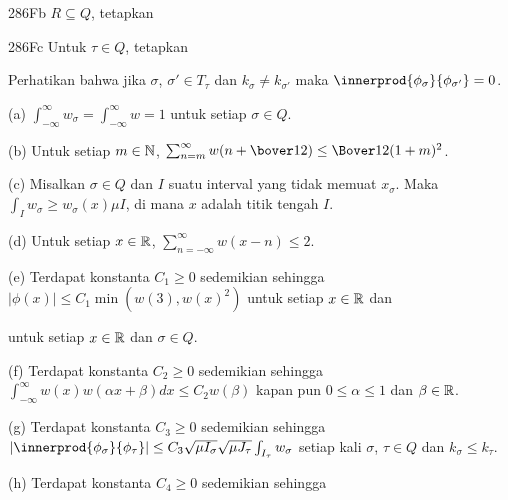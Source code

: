\spheader 286Fb $R\subseteq Q$, tetapkan


 
\spheader 286Fc Untuk $\tau\in Q$, tetapkan


\noindent Perhatikan bahwa jika $\sigma$, $\sigma'\in T_{\tau}$ dan
$k_{\sigma}\ne k_{\sigma'}$ maka
$\innerprod{\phi_{\sigma}}{\phi_{\sigma'}}=0$.

 (a)
$\int_{-\infty}^{\infty}w_{\sigma}=\int_{-\infty}^{\infty}w=1$ untuk setiap
$\sigma\in Q$.

(b) Untuk setiap $m\in\Bbb N$,
$\sum_{n=m}^{\infty}w(n+\bover12)\le\Bover1{2(1+m)^2}$.

(c) Misalkan $\sigma\in Q$ dan $I$ suatu interval yang tidak memuat
$x_{\sigma}$. Maka $\int_Iw_{\sigma}\ge
w_{\sigma}(x)\mu I$, di mana $x$ adalah titik tengah $I$.

(d) Untuk setiap $x\in\Bbb R$, $\sum_{n=-\infty}^{\infty}w(x-n)\le 2$.

(e) Terdapat konstanta $C_1\ge 0$ sedemikian sehingga $|\phi(x)|\le
C_1\min(w(3),w(x)^2)$ untuk setiap $x\in\Bbb R$ dan


\noindent untuk setiap $x\in\Bbb R$ dan $\sigma\in Q$.

(f) Terdapat konstanta $C_2\ge 0$ sedemikian sehingga
$\int_{-\infty}^{\infty}w(x)w(\alpha x+\beta)dx\le C_2w(\beta)$ kapan pun
$0\le\alpha\le 1$ dan $\beta\in\Bbb R$.

(g) Terdapat konstanta $C_3\ge 0$ sedemikian sehingga
$|\innerprod{\phi_{\sigma}}{\phi_{\tau}}|
\le C_3\sqrt{\mu I_{\sigma}}\sqrt{\mu J_{\tau}}\int_{I_{\tau}}w_{\sigma}$
setiap kali $\sigma$, $\tau\in Q$ dan $k_{\sigma}\le k_{\tau}$.

(h) Terdapat konstanta $C_4\ge 0$ sedemikian sehingga


